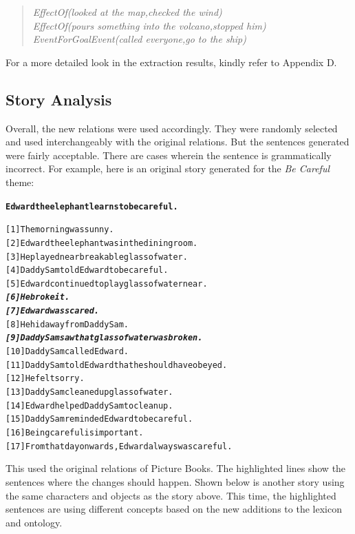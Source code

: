 \begin{verse}
\itshape
EffectOf(looked at the map,checked the wind)\\
EffectOf(pours something into the volcano,stopped him)\\
EventForGoalEvent(called everyone,go to the ship)
\end{verse}

For a more detailed look in the extraction results, kindly refer to Appendix D.

\subsection{Story Analysis}
\label{sec:storyanalysis}

Overall, the new relations were used accordingly. They were randomly selected and used interchangeably with the original relations. But the sentences generated were fairly acceptable. There are cases wherein the sentence is grammatically incorrect. For example, here is an original story generated for the \textit{Be Careful} theme:

\begin{alltt}
\textbf{Edward the elephant learns to be careful.}

[1]  The morning was sunny.
[2]  Edward the elephant was in the dining room.
[3]  He played near breakable glass of water.
[4]  Daddy Sam told Edward to be careful.
[5]  Edward continued to play glass of water near.
\emph{\textbf{[6]  He broke it.}}
\emph{\textbf{[7]  Edward was scared.}}
[8]  He hid away from Daddy Sam.
\emph{\textbf{[9]  Daddy Sam saw that glass of water was broken.}}
[10] Daddy Sam called Edward.
[11] Daddy Sam told Edward that he should have obeyed.
[12] He felt sorry.
[13] Daddy Sam cleaned up glass of water.
[14] Edward helped Daddy Sam to clean up.
[15] Daddy Sam reminded Edward to be careful.
[16] Being careful is important.
[17] From that day onwards, Edward always was careful.
\end{alltt}

This used the original relations of Picture Books. The highlighted lines show the sentences where the changes should happen. Shown below is another story using the same characters and objects as the story above. This time, the highlighted sentences are using different concepts based on the new additions to the lexicon and ontology.

